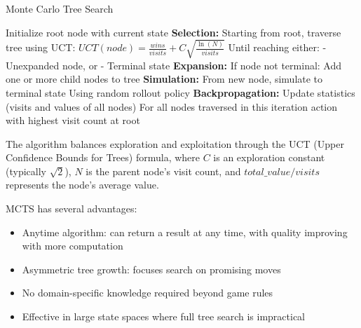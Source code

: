 \documentclass{article}
\begin{document}
\begin{algorithm}
\caption{Monte Carlo Tree Search}
\begin{algorithmic}[1]
\State Initialize root node with current state
    \State \textbf{Selection:}
    \State \hspace{\algorithmicindent} Starting from root, traverse tree using UCT:
    \State \hspace{\algorithmicindent} $UCT(node) = \frac{wins}{visits} + C\sqrt{\frac{\ln(N)}{visits}}$
    \State \hspace{\algorithmicindent} Until reaching either:
    \State \hspace{\algorithmicindent} - Unexpanded node, or
    \State \hspace{\algorithmicindent} - Terminal state
    \State \textbf{Expansion:}
    \State \hspace{\algorithmicindent} If node not terminal:
    \State \hspace{\algorithmicindent} Add one or more child nodes to tree
    \State \textbf{Simulation:}
    \State \hspace{\algorithmicindent} From new node, simulate to terminal state
    \State \hspace{\algorithmicindent} Using random rollout policy
    \State \textbf{Backpropagation:}
    \State \hspace{\algorithmicindent} Update statistics (visits and values of all nodes)
    \State \hspace{\algorithmicindent} For all nodes traversed in this iteration
\EndWhile
\State \Return action with highest visit count at root
\end{algorithmic}
\end{algorithm}

The algorithm balances exploration and exploitation through the UCT (Upper Confidence Bounds for Trees) formula, where $C$ is an exploration constant (typically $\sqrt{2}$), $N$ is the parent node's visit count, and $total\_value/visits$ represents the node's average value.

MCTS has several advantages:
\begin{itemize}
    \item Anytime algorithm: can return a result at any time, with quality improving with more computation
    \item Asymmetric tree growth: focuses search on promising moves
    \item No domain-specific knowledge required beyond game rules
    \item Effective in large state spaces where full tree search is impractical
\end{itemize}
\end{document}
